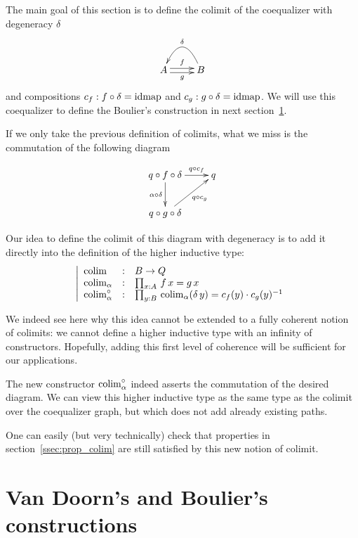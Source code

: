 The main goal of this section is to define the colimit of the
coequalizer with degeneracy $\delta$
\[
  \xymatrix{
    A \ar@<-.5ex>[r]_g \ar@<.5ex>[r]^f & B \ar@/_2pc/[l]_\delta
  }
\] 
and compositions $c_f:f \circ \delta = \operatorname{\mathrm{idmap}}$ and $c_g:g \circ \delta =
\operatorname{\mathrm{idmap}}$. We will use this coequalizer to define the Boulier's
construction in next section~\ref{sec:floris}.

If we only take the previous definition of colimits, what we miss is
the commutation of the following diagram

\[
  \xymatrix{
    q \circ f \circ \delta \ar[r]^-{q \circ c_f} \ar[d]_-{\alpha \circ \delta} & q \\
    q\circ g \circ \delta \ar[ru]_-{q\circ c_g}
  }
\]

Our idea to define the colimit of this diagram with degeneracy is to
add it directly into the definition of the higher inductive type:
\[
  \left|
    \begin{array}{lll}
      \mathrm{colim}&:& B \to Q \\
      \mathrm{colim}_\alpha&:& \prod_{x:A}\, f\, x = g\, x\\
      \mathrm{colim}_\alpha^\circ &:& \prod_{y:B}\, \mathrm{colim}_\alpha(\delta\, y) =
                              c_f(y)\cdot c_g(y)^{-1}
    \end{array}
  \right.
\]

\begin{rmq}
  We indeed see here why this idea cannot be extended to a fully
  coherent notion of colimits: we cannot define a higher inductive
  type with an infinity of constructors. Hopefully, adding this first
  level of coherence will be sufficient for our applications.
\end{rmq}

The new constructor $\mathrm{colim}_\alpha^\circ$ indeed asserts the
commutation of the desired diagram. We can view this higher inductive
type as the same type as the colimit over the coequalizer graph, but
which does not add already existing paths.

One can easily (but very technically) check that properties in
section~\ref{ssec:prop_colim} are still satisfied by this new notion
of colimit.


\section{Van Doorn's and Boulier's constructions}
\label{sec:floris}

